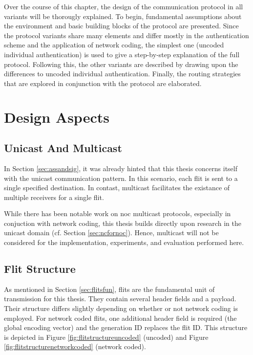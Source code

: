 Over the course of this chapter, the design of the communication protocol in all variants will be thorougly explained. To begin, fundamental
assumptions about the environment and basic building blocks of the protocol are presented. Since the protocol variants share many elements and differ
mostly in the authentication scheme and the application of network coding, the simplest one (uncoded individual authentication) is used to give a
step-by-step explanation of the full protocol. Following this, the other variants are described by drawing upon the differences to uncoded individual
authentication. Finally, the routing strategies that are explored in conjunction with the protocol are elaborated.

\section{Design Aspects}
\subsection{Unicast And Multicast}
In Section \ref{sec:assandsig}, it was already hinted that this thesis concerns itself with the unicast communication pattern. In this scenario, each
flit is sent to a single specified destination. In contast, multicast facilitates the existance of multiple receivers for a single flit.

While there has been notable work on \gls{noc} multicast protocols, especially in conjuction with network coding, this thesis builds directly upon
research in the unicast domain (cf. Section \ref{sec:ncfornoc}). Hence, multicast will not be considered for the implementation, experiments, and
evaluation performed here.

\subsection{Flit Structure}\label{subsec:flitstructure}
As mentioned in Section \ref{sec:flitsfun}, flits are the fundamental unit of transmission for this thesis. They contain several header fields and a
payload. Their structure differs slightly depending on whether or not network coding is employed. For network coded flits, one additional
header field is required (the global encoding vector) and the generation ID replaces the flit ID. This structure is depicted in Figure
\vref{fig:flitstructureuncoded} (uncoded) and Figure \ref{fig:flitstructurenetworkcoded} (network coded).

